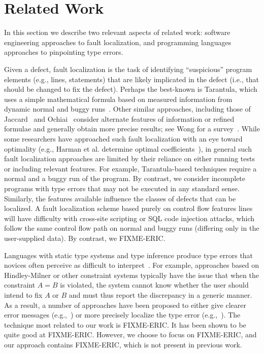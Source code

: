 \section{Related Work}
\label{sec:related-work}

In this section we describe two relevant aspects of related work:
software engineering approaches to fault localization, and 
programming languages approaches to pinpointing type errors. 

Given a defect, fault localization is the task of identifying
``suspicious'' program elements (e.g., lines, statements) that are likely
implicated in the defect (i.e., that should be changed to fix the defect). 
Perhaps the best-known is Tarantula, which uses a simple mathematical
formula based on measured information from dynamic normal and buggy
runs~\cite{Jones2002-us}. Other similar approaches, including those of
Jaccard~\cite{Chen2002-qz} and
Ochiai~\cite{Abreu2006-fn,Abreu2007-mu} consider alternate features
of information or refined formulae and generally obtain more precise
results; see Wong for a survey~\cite{Wong2009-pd}. While some researchers have
approached such fault localization with an eye toward optimality (e.g.,
Harman et al. determine optimal coefficients~\cite{Yoo2013-rw}), in general
such fault localization approaches are limited by their reliance on either
running tests or including relevant features. For example, Tarantula-based 
techniques require a normal and a buggy run of the program. By contrast,
we consider incomplete programs with type errors that may not be executed
in any standard sense. Similarly, the features available influence the
classes of defects that can be localized. A fault localization scheme based
purely on control flow features lines will have difficulty with cross-site
scripting or SQL code injection attacks, which follow the same control flow
path on normal and buggy runs (differing only in the user-supplied data).
By contrast, we FIXME-ERIC.

Languages with static type systems and type inference produce type errors
that novices often perceive as difficult to interpret~\cite{FIXME}.  For
example, approaches based on Hindley-Milner or other constraint systems 
typically have the issue that when the constraint $A=B$ is violated, 
the system cannot know whether the user should intend to fix $A$ or $B$ and
must thus report the discrepancy in a generic manner. As a result, a number
of approaches have been proposed to either give clearer error messages
(e.g.,~\cite{FIXME}) or more precisely localize the type error
(e.g.,~\cite{FIXME}). The technique most related to our work is FIXME-ERIC. 
It has been shown to be quite good at FIXME-ERIC. However, we choose to 
focus on FIXME-ERIC, and our approach contains FIXME-ERIC, which is not
present in previous work. 

